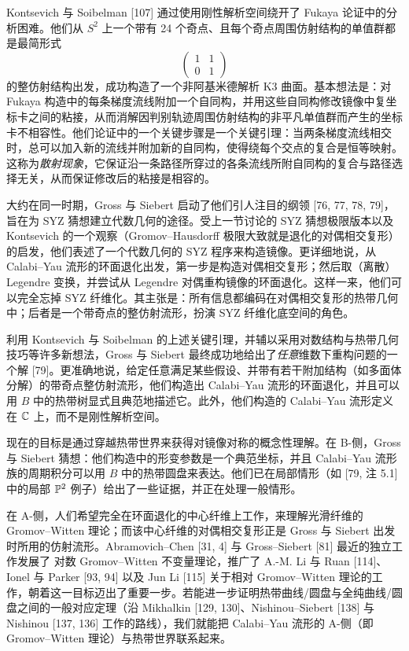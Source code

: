 Kontsevich 与 Soibelman [107] 通过使用刚性解析空间绕开了 Fukaya 论证中的分析困难。他们从 $S^2$ 上一个带有 24 个奇点、且每个奇点周围仿射结构的单值群都是最简形式
\[
  \begin{pmatrix} 1 & 1 \\ 0 & 1 \end{pmatrix}
\]
的整仿射结构出发，成功构造了一个非阿基米德解析 K3 曲面。基本想法是：对 Fukaya 构造中的每条梯度流线附加一个自同构，并用这些自同构修改镜像中复坐标卡之间的粘接，从而消解因判别轨迹周围仿射结构的非平凡单值群而产生的坐标卡不相容性。他们论证中的一个关键步骤是一个关键引理：当两条梯度流线相交时，总可以加入新的流线并附加新的自同构，使得绕每个交点的复合是恒等映射。这称为\emph{散射现象}，它保证沿一条路径所穿过的各条流线所附自同构的复合与路径选择无关，从而保证修改后的粘接是相容的。

大约在同一时期，Gross 与 Siebert 启动了他们引人注目的纲领 [76, 77, 78, 79]，旨在为 SYZ 猜想建立代数几何的途径。受上一节讨论的 SYZ 猜想极限版本以及 Kontsevich 的一个观察（Gromov--Hausdorff 极限大致就是退化的对偶相交复形）的启发，他们表述了一个代数几何的 SYZ 程序来构造镜像。更详细地说，从 Calabi--Yau 流形的环面退化出发，第一步是构造对偶相交复形；然后取（离散）Legendre 变换，并尝试从 Legendre 对偶重构镜像的环面退化。这样一来，他们可以完全忘掉 SYZ 纤维化。其主张是：所有信息都编码在对偶相交复形的热带几何中；后者是一个带奇点的整仿射流形，扮演 SYZ 纤维化底空间的角色。

利用 Kontsevich 与 Soibelman 的上述关键引理，并辅以采用对数结构与热带几何技巧等许多新想法，Gross 与 Siebert 最终成功地给出了\emph{任意}维数下重构问题的一个解 [79]。更准确地说，给定任意满足某些假设、并带有若干附加结构（如多面体分解）的带奇点整仿射流形，他们构造出 Calabi--Yau 流形的环面退化，并且可以用 $B$ 中的热带树显式且典范地描述它。此外，他们构造的 Calabi--Yau 流形定义在 $\mathbb{C}$ 上，而不是刚性解析空间。

现在的目标是通过穿越热带世界来获得对镜像对称的概念性理解。在 B-侧，Gross 与 Siebert 猜想：他们构造中的形变参数是一个典范坐标，并且 Calabi--Yau 流形族的周期积分可以用 $B$ 中的热带圆盘来表达。他们已在局部情形（如 [79, 注 5.1] 中的局部 $\mathbb{P}^2$ 例子）给出了一些证据，并正在处理一般情形。

在 A-侧，人们希望完全在环面退化的中心纤维上工作，来理解光滑纤维的 Gromov--Witten 理论；而该中心纤维的对偶相交复形正是 Gross 与 Siebert 出发时所用的仿射流形。Abramovich--Chen [31, 4] 与 Gross--Siebert [81] 最近的独立工作发展了 对数 Gromov--Witten 不变量理论，推广了 A.-M. Li 与 Ruan [114]、Ionel 与 Parker [93, 94] 以及 Jun Li [115] 关于相对 Gromov--Witten 理论的工作，朝着这一目标迈出了重要一步。若能进一步证明热带曲线/圆盘与全纯曲线/圆盘之间的一般对应定理（沿 Mikhalkin [129, 130]、Nishinou--Siebert [138] 与 Nishinou [137, 136] 工作的路线），我们就能把 Calabi--Yau 流形的 A-侧（即 Gromov--Witten 理论）与热带世界联系起来。

